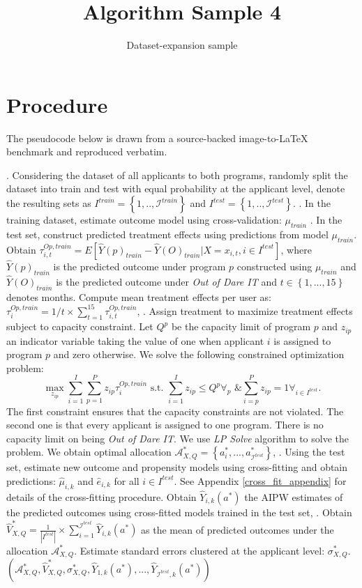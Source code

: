 \documentclass[11pt]{article}
\title{Algorithm Sample 4}
\author{Dataset-expansion sample}
\date{}
\begin{document}
\maketitle
\section{Procedure}
The pseudocode below is drawn from a source-backed image-to-LaTeX benchmark and reproduced verbatim.

\begin{algorithmic}
. Considering the dataset of all applicants to both programs, randomly split the dataset into train and test with equal probability at the applicant level, denote the resulting sets as $I^{train} = \left\{1,..,\mathcal{I}^{train}\right\}$ and $I^{test}= \left\{1,..,\mathcal{I}^{test}\right\}$.
. In the training dataset, estimate outcome model using cross-validation: $\mu_{train}$
. In the test set, construct predicted treatment effects using predictions from model $\mu_{train}$. Obtain $\tau^{Op,train}_{i,t} = E[\hat{Y}(p)_{train} - \hat{Y}(O)_{train}|X=x_{i,t} , i \in I^{test}]$, where $\hat{Y}(p)_{train}$ is the predicted outcome under program $p$ constructed using $\mu_{train}$ and $\hat{Y}(O)_{train}$ is the predicted outcome under \emph{Out of Dare IT} and $t \in \left\{1,...,15\right\}$ denotes months. Compute mean treatment effects per user as: $\tau^{Op,train}_{i} = 1/t \times \sum_{t=1}^{15}\tau^{Op,train}_{i,t}$,
. Assign treatment to maximize treatment effects subject to capacity constraint. Let $Q^{p}$ be the capacity limit of program $p$ and $z_{ip}$ an indicator variable taking the value of one when applicant $i$ is assigned to program $p$ and zero otherwise. We solve the following constrained optimization problem:
\[
\max_{z_{ip}}\sum_{i=1}^{I}\sum_{p=1}^{P}z_{ip}\tau_{i}^{Op,train} \text{ s.t. }\sum_{i=1}^{I}z_{ip} \leq Q^{p} \forall_{p} \text{ \& }\sum_{i=p}^{P}z_{ip} = 1\forall_{i \in I^{test}}.
\] The first constraint ensures that the capacity constraints are not violated. The second one is that every applicant is assigned to one program. There is no capacity limit on being \emph{Out of Dare IT}. We use \emph{LP Solve} algorithm to solve the problem. We obtain optimal allocation $\mathcal{A}_{X,Q}^{*} = \left\{a_{i}^{*},...,a_{\mathcal{I}^{test}}^{*}\right\}$,
. Using the test set, estimate new outcome and propensity models using cross-fitting and obtain predictions: $\hat{\mu}_{i,k}$ and $\hat{e}_{i,k}$ for all $i \in I^{test}$. See Appendix \ref{cross_fit_appendix} for details of the cross-fitting procedure. Obtain $\hat{Y}_{i,k}(a^{*})$ the AIPW estimates of the predicted outcomes using cross-fitted models trained in the test set,
. Obtain $\hat{V}_{X,Q}^{*} = \frac{1}{|I^{test}|}\times \sum_{i=1}^{\mathcal{I}^{test}}\hat{Y}_{i,k}(a^{*})$ as the mean of predicted outcomes under the allocation $\mathcal{A}_{X,Q}^{*}$. Estimate standard errors clustered at the applicant level: $\sigma_{X,Q}^{*}$. \Comment \\
\Return{} $(\mathcal{A}_{X,Q}^{*},\hat{V}_{X,Q}^{*},\sigma_{X,Q}^{*},\hat{Y}_{1,k}(a^{*}),...,\hat{Y}_{\mathcal{I}^{test},k}(a^{*}) )$
\end{algorithmic}
\end{document}
